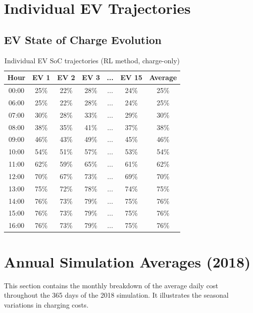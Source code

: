 \section{Individual EV Trajectories}
\label{app:ev_trajectories}

\subsection{EV State of Charge Evolution}

\begin{table}[H]
\centering
\caption{Individual EV SoC trajectories (RL method, charge-only)}
\label{tab:app_ev_soc}
\begin{tabular}{@{}ccccccc@{}}
\toprule
\textbf{Hour} & \textbf{EV 1} & \textbf{EV 2} & \textbf{EV 3} & \textbf{...} & \textbf{EV 15} & \textbf{Average} \\
\midrule
00:00 & 25\% & 22\% & 28\% & ... & 24\% & 25\% \\
06:00 & 25\% & 22\% & 28\% & ... & 24\% & 25\% \\
07:00 & 30\% & 28\% & 33\% & ... & 29\% & 30\% \\
08:00 & 38\% & 35\% & 41\% & ... & 37\% & 38\% \\
09:00 & 46\% & 43\% & 49\% & ... & 45\% & 46\% \\
10:00 & 54\% & 51\% & 57\% & ... & 53\% & 54\% \\
11:00 & 62\% & 59\% & 65\% & ... & 61\% & 62\% \\
12:00 & 70\% & 67\% & 73\% & ... & 69\% & 70\% \\
13:00 & 75\% & 72\% & 78\% & ... & 74\% & 75\% \\
14:00 & 76\% & 73\% & 79\% & ... & 75\% & 76\% \\
15:00 & 76\% & 73\% & 79\% & ... & 75\% & 76\% \\
16:00 & 76\% & 73\% & 79\% & ... & 75\% & 76\% \\
\bottomrule
\end{tabular}
\end{table}

\section{Annual Simulation Averages (2018)}
\label{app:annual_averages}

This section contains the monthly breakdown of the average daily cost throughout the 365 days of the 2018 simulation. It illustrates the seasonal variations in charging costs.

